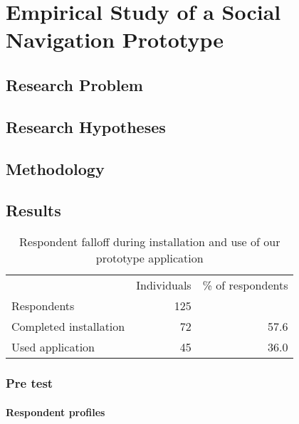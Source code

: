 \chapter{Empirical Study of a Social Navigation Prototype}
\label{chapter:empirical}

\section{Research Problem}

\section{Research Hypotheses}

\section{Methodology}
\label{section:empirical.methodology}

\section{Results}

\begin{table}[h]
  \begin{tabular}{lrr}

    &
    \multicolumn{1}{c}{Individuals} &
    \multicolumn{1}{c}{\% of respondents} \\

    \cmidrule(lr){2-2}
    \cmidrule(lr){3-3}

    Respondents &
    125 &
    \\

    Completed installation &
    72 &
    57.6 \\

    Used application &
    45 &
    36.0 \\

  \end{tabular}
  \caption[Respondents Falloff]{%
    Respondent falloff during installation and use of our prototype
    application}
  \label{table:respondents.falloff}
\end{table}

\subsection{Pre test}

\subsubsection{Respondent profiles}

